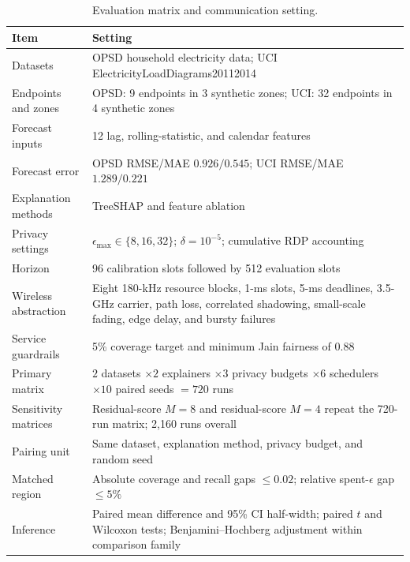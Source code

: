 \documentclass[10pt,conference]{IEEEtran}
\begin{document}
\begin{table}[htbp]
\caption{Evaluation matrix and communication setting.}
\label{tab:protocol}
\centering\small
\begin{tabular}{p{}p{}}
\toprule
Item & Setting\\ \midrule
Datasets & OPSD household electricity data; UCI ElectricityLoadDiagrams20112014\\
Endpoints and zones & OPSD: 9 endpoints in 3 synthetic zones; UCI: 32 endpoints in 4 synthetic zones\\
Forecast inputs & 12 lag, rolling-statistic, and calendar features\\
Forecast error & OPSD RMSE/MAE $0.926/0.545$; UCI RMSE/MAE $1.289/0.221$\\
Explanation methods & TreeSHAP and feature ablation\\
Privacy settings & $\epsilon_{\max}\in\{8,16,32\}$; $\delta=10^{-5}$; cumulative RDP accounting\\
Horizon & 96 calibration slots followed by 512 evaluation slots\\
Wireless abstraction & Eight 180-kHz resource blocks, 1-ms slots, 5-ms deadlines, 3.5-GHz carrier, path loss, correlated shadowing, small-scale fading, edge delay, and bursty failures\\
Service guardrails & 5\% coverage target and minimum Jain fairness of 0.88\\
Primary matrix & $2$ datasets $\times2$ explainers $\times3$ privacy budgets $\times6$ schedulers $\times10$ paired seeds $=720$ runs\\
Sensitivity matrices & Residual-score $M=8$ and residual-score $M=4$ repeat the 720-run matrix; 2,160 runs overall\\
Pairing unit & Same dataset, explanation method, privacy budget, and random seed\\
Matched region & Absolute coverage and recall gaps $\leq0.02$; relative spent-$\epsilon$ gap $\leq5\%$\\
Inference & Paired mean difference and 95\% CI half-width; paired $t$ and Wilcoxon tests; Benjamini--Hochberg adjustment within comparison family\\
\bottomrule
\end{tabular}
\end{table}
\end{document}
